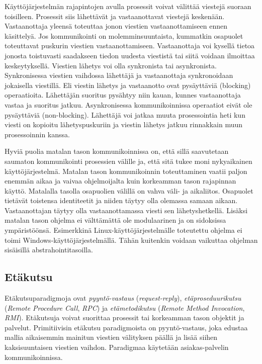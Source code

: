 Käyttöjärjestelmän rajapintojen avulla prosessit voivat välittää viestejä suoraan toisilleen. Prosessit siis lähettävät ja vastaanottavat viestejä keskenään. Vastaanottaja yleensä toteuttaa jonon viestien vastaanottamiseen ennen käsittelyä. Jos kommunikointi on molemminsuuntaista, kummatkin osapuolet toteuttavat puskurin viestien vastaanottamiseen. Vastaanottaja voi kysellä tietoa jonosta toistuvasti saadakseen tiedon uudesta viestistä tai siitä voidaan ilmoittaa keskeytyksellä. Viestien lähetys voi olla synkronista tai asynkronista. Synkronisessa viestien vaihdossa lähettäjä ja vastaanottaja synkronoidaan jokaisella viestillä. Eli viestin lähetys ja vastaanotto ovat pysäyttäviä (blocking) operaatioita. Lähettäjän suoritus pysähtyy niin kauan, kunnes vastaanottaja vastaa ja suoritus jatkuu. Asynkronisessa kommunikoinnissa operaatiot eivät ole pysäyttäviä (non-blocking). Lähettäjä voi jatkaa muuta prosessointia heti kun viesti on kopioitu lähetyspuskuriin ja viestin lähetys jatkuu rinnakkain muun prosessoinnin kanssa. \mbox{\cite[s.~147--148]{distributed-systems-concepts-and-design}}

Hyviä puolia matalan tason kommunikoinnissa on, että sillä saavutetaan saumaton kommunikointi prosessien välille ja, että sitä tukee moni nykyaikainen käyttöjärjestelmä. Matalan tason kommunikoinnin toteuttaminen vaatii paljon enemmän aikaa ja vaivaa ohjelmoijalta kuin korkeamman tason rajapinnan käyttö. Matalalla tasolla osapuolien välillä on vahva väli- ja aikaliitos. Osapuolet tietävät toistensa identiteetit ja niiden täytyy olla olemassa samaan aikaan. Vastaanottajan täytyy olla vastaanottamassa viesti sen lähetyshetkellä. Lisäksi matalan tason ohjelma ei välttämättä ole modulaarinen ja on sidoksissa ympäristöönsä. Esimerkkinä Linux-käyt\-tö\-jär\-jes\-tel\-mäl\-le toteutettu ohjelma ei toimi Windows-käyttöjärjestelmällä. Tähän kuitenkin voidaan vaikuttaa ohjelman sisäisillä abstrahointitasoilla.


\subsection{Etäkutsu}
\label{ch:remote-invocation}
Etäkutsuparadigmoja ovat \emph{pyyntö-vastaus} (\emph{request-reply}), \emph{etäproseduurikutsu} (\emph{Re\-mo\-te Pro\-ce\-du\-re Call}, \emph{RPC}) ja \emph{etämetodikutsu} (\emph{Remote Method Invocation}, \emph{RMI}). Etäkutsuja voivat suorittaa prosessit tai korkeamman tason objektit ja palvelut. Primitiivisin etäkutsu paradigmoista on pyyntö-vastaus, joka edustaa mallia aikaisemmin mainitun viestien välityksen päällä ja lisää siihen kaksisuuntaisen viestien vaihdon. Paradigmaa käytetään asiakas-palvelin kommunikoinnissa. \mbox{\cite[s.~185--186]{distributed-systems-concepts-and-design}}

